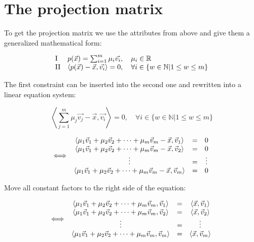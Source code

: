 \documentclass{article}
\newcommand{\rz}[1]{\ensuremath{\mathord{\mathrm{#1}}}}
\newcommand{\lrangle}[1]{\left\langle #1 \right\rangle}
\begin{document}
\section{The projection matrix}
To get the projection matrix we use the attributes from above and give them a
generalized mathematical form:

    \begin{equation}
        \begin{array}{l l}
            \rz{I}  &
            p(\vec{x}) = \sum_{i=1}^{m}{\mu _i\vec{v_i}}, \quad \mu _i \in
              \mathbb{R} \\
            \rz{II} &
            \lrangle{ p(\vec{x}) - \vec{x}, \vec{v_i} } = 0, \quad \forall i \in
              \{ w \in \mathbb{N} | 1 \leq w \leq m \}
        \end{array}
    \end{equation}

The first constraint can be inserted into the second one and rewritten into a
linear equation system:

    \begin{equation}
        \lrangle{ \sum_{j=1}^{m}{\mu _j\vec{v_j}} - \vec{x}, \vec{v_i} } = 0,
        \quad \forall i \in \{ w \in \mathbb{N} | 1 \leq w \leq m \}
    \end{equation}

    \begin{equation}
        \iff
        \begin{array}{c c c}
            \lrangle{ \mu _1 \vec{v}_1 + \mu _2 \vec{v}_2 + \cdots + \mu _m
              \vec{v}_m - \vec{x}, \vec{v}_1 } &
            = &
            0 \\
            \lrangle{ \mu _1 \vec{v}_1 + \mu _2 \vec{v}_2 + \cdots + \mu _m
              \vec{v}_m - \vec{x}, \vec{v}_2 } &
            = &
            0 \\
            \vdots &
            = &
            \vdots \\
            \lrangle{ \mu _1 \vec{v}_1 + \mu _2 \vec{v}_2 + \cdots + \mu _m
              \vec{v}_m - \vec{x}, \vec{v}_m } &
            = &
            0
        \end{array}
    \end{equation}

Move all constant factors to the right side of the equation:

    \begin{equation}
        \iff
        \begin{array}{c c c}
            \lrangle{ \mu _1 \vec{v}_1 + \mu _2 \vec{v}_2 + \cdots + \mu _m
              \vec{v}_m, \vec{v}_1 } & = & \lrangle{ \vec{x}, \vec{v}_1 } \\
            \lrangle{ \mu _1 \vec{v}_1 + \mu _2 \vec{v}_2 + \cdots + \mu _m
              \vec{v}_m, \vec{v}_2 } & = & \lrangle{ \vec{x}, \vec{v}_2 } \\
            \vdots & = & \vdots \\
            \lrangle{ \mu _1 \vec{v}_1 + \mu _2 \vec{v}_2 + \cdots + \mu _m
              \vec{v}_m, \vec{v}_m } & = & \lrangle{ \vec{x}, \vec{v}_m }
        \end{array}
    \end{equation}
\end{document}
